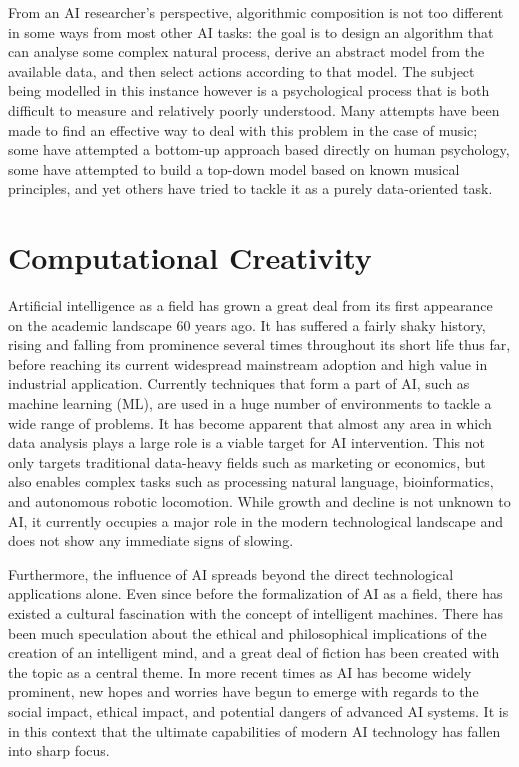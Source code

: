 \documentclass[ author={Stephen Livermore-Tozer},
				supervisor={Dr. Peter Flach},
				degree={MEng},
				title={Algorithmic Co-composition Using Machine Learning},
				subtitle={},
				type={research},
				year={2016} ]{dissertation}
\begin{document}
	From an AI researcher's perspective, algorithmic composition is not too different in some ways from most other AI tasks: the goal is to design an algorithm that can analyse some complex natural process, derive an abstract model from the available data, and then select actions according to that model. The subject being modelled in this instance however is a psychological process that is both difficult to measure and relatively poorly understood. Many attempts have been made to find an effective way to deal with this problem in the case of music; some have attempted a bottom-up approach based directly on human psychology, some have attempted to build a top-down model based on known musical principles, and yet others have tried to tackle it as a purely data-oriented task.

	\section{Computational Creativity}
	
	Artificial intelligence as a field has grown a great deal from its first appearance on the academic landscape 60 years ago. It has suffered a fairly shaky history, rising and falling from prominence several times throughout its short life thus far, before reaching its current widespread mainstream adoption and high value in industrial application. Currently techniques that form a part of AI, such as machine learning (ML), are used in a huge number of environments to tackle a wide range of problems. It has become apparent that almost any area in which data analysis plays a large role is a viable target for AI intervention. This not only targets traditional data-heavy fields such as marketing or economics, but also enables complex tasks such as processing natural language, bioinformatics, and autonomous robotic locomotion. While growth and decline is not unknown to AI, it currently occupies a major role in the modern technological landscape and does not show any immediate signs of slowing.
	
	Furthermore, the influence of AI spreads beyond the direct technological applications alone. Even since before the formalization of AI as a field, there has existed a cultural fascination with the concept of intelligent machines. There has been much speculation about the ethical and philosophical implications of the creation of an intelligent mind, and a great deal of fiction has been created with the topic as a central theme. In more recent times as AI has become widely prominent, new hopes and worries have begun to emerge with regards to the social impact, ethical impact, and potential dangers of advanced AI systems. It is in this context that the ultimate capabilities of modern AI technology has fallen into sharp focus.
	
\end{document}
